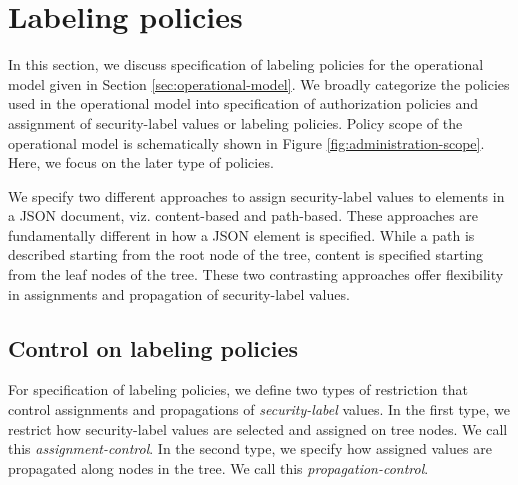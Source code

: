 \newcommand{\assignmentControl}{\textit{assignment-control}}
\newcommand{\propagationControl}{\textit{propagation-control}}
\section{Labeling policies}
\label{sec:administrative-model}
 


 
 In this section, we discuss specification of labeling policies for the operational model given in Section \ref{sec:operational-model}. We broadly categorize the policies used in the operational model into specification of authorization policies and assignment of security-label values or labeling policies. Policy scope of the operational model is schematically shown in Figure \ref{fig:administration-scope}. Here, we focus on the later type of policies.
 
  
 
 We specify two different approaches to assign security-label values to elements in a JSON document, viz. content-based and  path-based. These approaches are fundamentally different in how a JSON element is specified. While a path is described starting from the root node of the tree, content is specified starting from the leaf nodes of the tree. These two contrasting approaches offer flexibility in assignments and propagation of security-label values.
 
 
 \subsection{Control on labeling policies}
 
 

For specification of labeling policies, we define two types of restriction that control assignments and propagations of \textit{security-label} values. In the first type, we restrict how security-label values are selected and assigned on tree nodes. We call this \assignmentControl{}. In the second type, we specify how assigned values are propagated along nodes in the tree. We call this \propagationControl{}. 
 
